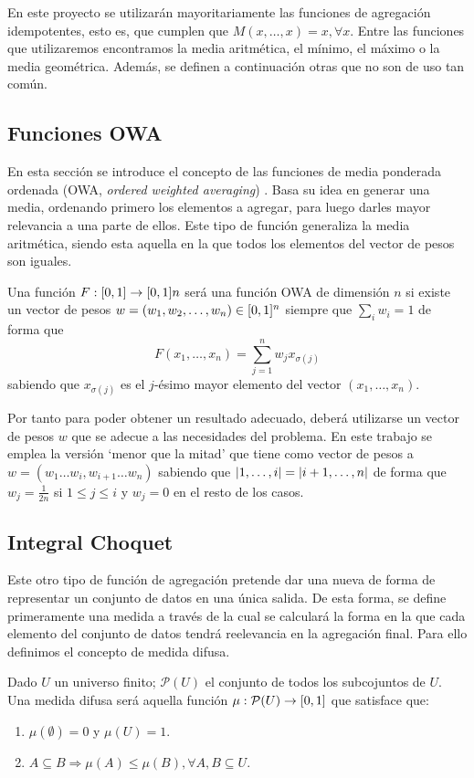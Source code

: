 En este proyecto se utilizarán mayoritariamente las funciones de agregación idempotentes, esto es, que cumplen que $M(x,\dots ,x)=x, \forall x$. Entre las funciones que utilizaremos encontramos la media aritmética, el mínimo, el máximo o la media geométrica. Además, se definen a continuación otras que no son de uso tan común.
\subsection{Funciones OWA}
En esta sección se introduce el concepto de las funciones de media ponderada ordenada (OWA, {\em  ordered weighted averaging}) \cite{art:yagerowa, art:paternain, art:bustinceowa}. Basa su idea en generar una media, ordenando primero los elementos a agregar, para luego darles mayor relevancia a una parte de ellos. Este tipo de función generaliza la media aritmética, siendo esta aquella en la que todos los elementos del vector de pesos son iguales.

\begin{definition}\label{def:owa}
Una  función $F:\unitspace{n}$ será una función OWA de dimensión $n$ si existe un vector de pesos $w=(w_{1},w_{2},\dots,w_{n})\in [0,1]^{n}$ siempre que $\sum_{i}w_{i}=1$ de forma que
$$F(x_{1},\dots,x_{n})=\sum^{n}_{j=1}w_{j}x_{\sigma(j)}$$
sabiendo que $x_{\sigma(j)}$ es el $j$-ésimo mayor elemento del vector $(x_{1},\dots,x_{n})$.
\end{definition}

Por tanto para poder obtener un resultado adecuado, deberá utilizarse un vector de pesos $w$ que se adecue a las necesidades del problema. En este trabajo se emplea la versión `menor que la mitad' que tiene como vector de pesos a $w=(w_{1}\dots w_{i}, w_{i+1}\dots w_{n})$ sabiendo que $\left\vert1, \dots, i\right\vert=\left\vert i+1,\dots,n\right\vert$ de forma que $w_{j}=\frac{1}{2n}$ si $1\leq j\leq i$ y $w_{j}=0$ en el resto de los casos.

\subsection{Integral Choquet}
Este otro tipo de función \cite{art:choquet, art:sugenochoquet} de agregación pretende dar una nueva de forma de representar un conjunto de datos en una única salida. De esta forma, se define primeramente una medida a través de la cual se calculará la forma en la que cada elemento del conjunto de datos tendrá reelevancia en la agregación final. Para ello definimos el concepto de medida difusa.
\begin{definition}\label{def:medidadifusa}
Dado $U$ un universo finito; $\mathcal{P}(U)$ el conjunto de todos los subcojuntos de $U$. Una medida difusa será aquella función $\mu:\mathcal{P}(U)\rightarrow[0,1]$ que satisface que:
\begin{enumerate}
	\item $\mu(\emptyset)=0$ y $\mu(U)=1$.
	\item $A\subseteq B \Rightarrow \mu(A)\leq\mu (B), \forall A, B \subseteq U$.
\end{enumerate}
\end{definition}

